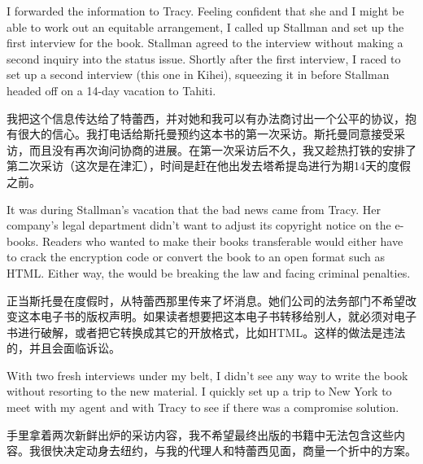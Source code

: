 \ifdefined\eng
I forwarded the information to Tracy. Feeling confident that she and I might be able to work out an equitable arrangement, I called up Stallman and set up the first interview for the book. Stallman agreed to the interview without making a second inquiry into the status issue. Shortly after the first interview, I raced to set up a second interview (this one in Kihei), squeezing it in before Stallman headed off on a 14-day vacation to Tahiti. %
\fi

\ifdefined\chs
我把这个信息传达给了特蕾西，并对她和我可以有办法商讨出一个公平的协议，抱有很大的信心。我打电话给斯托曼预约这本书的第一次采访。斯托曼同意接受采访，而且没有再次询问协商的进展。在第一次采访后不久，我又趁热打铁的安排了第二次采访（这次是在津汇），时间是赶在他出发去塔希提岛进行为期14天的度假之前。%
\fi

\ifdefined\eng
It was during Stallman's vacation that the bad news came from Tracy. Her company's legal department didn't want to adjust its copyright notice on the e-books. Readers who wanted to make their books transferable would either have to crack the encryption code or convert the book to an open format such as HTML. Either way, the would be breaking the law and facing criminal penalties.
\fi

\ifdefined\chs
正当斯托曼在度假时，从特蕾西那里传来了坏消息。她们公司的法务部门不希望改变这本电子书的版权声明。如果读者想要把这本电子书转移给别人，就必须对电子书进行破解，或者把它转换成其它的开放格式，比如HTML。这样的做法是违法的，并且会面临诉讼。
\fi

\ifdefined\eng
With two fresh interviews under my belt, I didn't see any way to write the book without resorting to the new material. I quickly set up a trip to New York to meet with my agent and with Tracy to see if there was a compromise solution.
\fi

\ifdefined\chs
手里拿着两次新鲜出炉的采访内容，我不希望最终出版的书籍中无法包含这些内容。我很快决定动身去纽约，与我的代理人和特蕾西见面，商量一个折中的方案。
\fi

